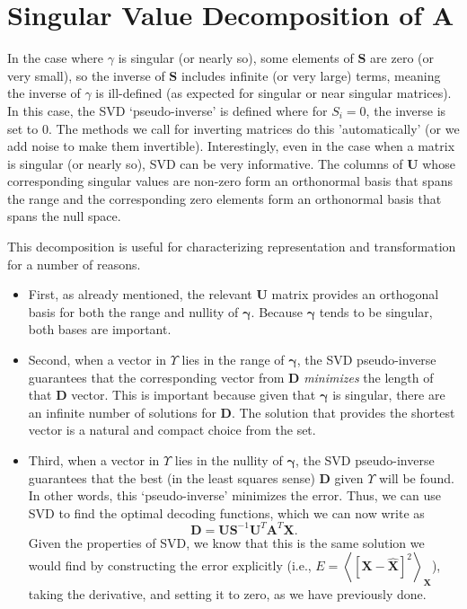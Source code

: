 \documentclass[10pt,letterpaper,oneside]{article}
\begin{document}
\section{Singular Value Decomposition of $\mathbf{A}$}

In the case where $\gamma$ is singular (or nearly so), some elements
of $\mathbf{S}$ are zero (or very small), so the inverse of $\mathbf{S}$
includes infinite (or very large) terms, meaning the inverse of $\gamma$
is ill-defined (as expected for singular or near singular matrices).
In this case, the SVD `pseudo-inverse' is defined where for $S_{i}=0$,
the inverse is set to $0$. The methods we call for inverting matrices do this 'automatically' (or we add noise to make them invertible). Interestingly, even in the case when a matrix is singular (or nearly so), SVD can
be very informative. The columns of $\mathbf{U}$ whose corresponding
singular values are non-zero form an orthonormal basis that spans
the range and the corresponding zero elements form an orthonormal
basis that spans the null space.


This decomposition is useful for characterizing representation and
transformation for a number of reasons. 
\begin{itemize}
\item First, as already mentioned, the relevant $\mathbf{U}$ matrix provides
an orthogonal basis for both the range and nullity of $\boldsymbol{\gamma}$.
Because $\boldsymbol{\gamma}$ tends to be singular, both bases are
important. 
\item Second, when a vector in $\Upsilon$ lies in the range of $\boldsymbol{\gamma}$,
the SVD pseudo-inverse guarantees that the corresponding vector from
$\mathbf{D}$ \emph{minimizes}
the length of that $\mathbf{D}$ vector. This is important
because given that $\boldsymbol{\gamma}$ is singular, there are an
infinite number of solutions for $\mathbf{D}$. The solution
that provides the shortest vector is a natural and compact choice
from the set. 
\item Third, when a vector in $\Upsilon$ lies in the nullity of $\boldsymbol{\gamma}$,
the SVD pseudo-inverse guarantees that the best (in the least squares
sense) $\mathbf{D}$ given $\Upsilon$ will be found. In other
words, this `pseudo-inverse' minimizes the error. Thus, we can use
SVD to find the optimal decoding functions, which we can now write
as
\begin{equation}
  \mathbf{D}=\mathbf{US}^{-1}\mathbf{U}^{T}\mathbf{A}^{T}\mathbf{X}.\label{c4.eq.phi.svd}
\end{equation}
Given the properties of SVD, we know that this is the same solution
we would find by constructing the error explicitly (i.e., $E=\left\langle \left[\mathbf{X}-\hat{\mathbf{X}}\right]^{2}\right\rangle _{\mathbf{X}}$),
taking the derivative, and setting it to zero, as we have previously
done. 
\end{itemize}
\end{document}
